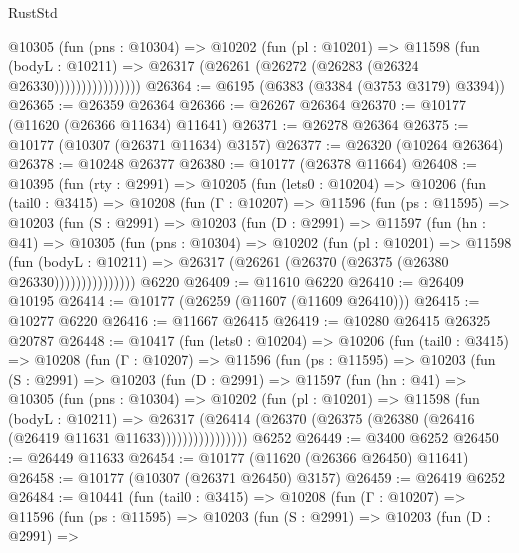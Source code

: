 \begin{lexlean}{RustStd}
\begin{coremodule}
                    @10305
                      (fun (pns : @10304) =>
                      @10202
                        (fun (pl : @10201) =>
                        @11598
                          (fun (bodyL : @10211) =>
                          @26317 (@26261 (@26272 (@26283 (@26324 @26330))))))))))))))))
@26364 := @6195 (@6383 (@3384 (@3753 @3179) @3394))
@26365 := @26359 @26364
@26366 := @26267 @26364
@26370 := @10177 (@11620 (@26366 @11634) @11641)
@26371 := @26278 @26364
@26375 := @10177 (@10307 (@26371 @11634) @3157)
@26377 := @26320 (@10264 @26364)
@26378 := @10248 @26377
@26380 := @10177 (@26378 @11664)
@26408 := @10395
    (fun (rty : @2991) =>
    @10205
      (fun (lets0 : @10204) =>
      @10206
        (fun (tail0 : @3415) =>
        @10208
          (fun (Γ : @10207) =>
          @11596
            (fun (ps : @11595) =>
            @10203
              (fun (S : @2991) =>
              @10203
                (fun (D : @2991) =>
                @11597
                  (fun (hn : @41) =>
                  @10305
                    (fun (pns : @10304) =>
                    @10202
                      (fun (pl : @10201) =>
                      @11598
                        (fun (bodyL : @10211) =>
                        @26317 (@26261 (@26370 (@26375 (@26380 @26330)))))))))))))))
    @6220
@26409 := @11610 @6220
@26410 := @26409 @10195
@26414 := @10177 (@26259 (@11607 (@11609 @26410)))
@26415 := @10277 @6220
@26416 := @11667 @26415
@26419 := @10280 @26415 @26325 @20787
@26448 := @10417
    (fun (lets0 : @10204) =>
    @10206
      (fun (tail0 : @3415) =>
      @10208
        (fun (Γ : @10207) =>
        @11596
          (fun (ps : @11595) =>
          @10203
            (fun (S : @2991) =>
            @10203
              (fun (D : @2991) =>
              @11597
                (fun (hn : @41) =>
                @10305
                  (fun (pns : @10304) =>
                  @10202
                    (fun (pl : @10201) =>
                    @11598
                      (fun (bodyL : @10211) =>
                      @26317
                        (@26414
                          (@26370 (@26375 (@26380 (@26416 (@26419 @11631 @11633))))))))))))))))
    @6252
@26449 := @3400 @6252
@26450 := @26449 @11633
@26454 := @10177 (@11620 (@26366 @26450) @11641)
@26458 := @10177 (@10307 (@26371 @26450) @3157)
@26459 := @26419 @6252
@26484 := @10441
    (fun (tail0 : @3415) =>
    @10208
      (fun (Γ : @10207) =>
      @11596
        (fun (ps : @11595) =>
        @10203
          (fun (S : @2991) =>
          @10203
            (fun (D : @2991) =>

\end{coremodule}
\end{lexlean}
